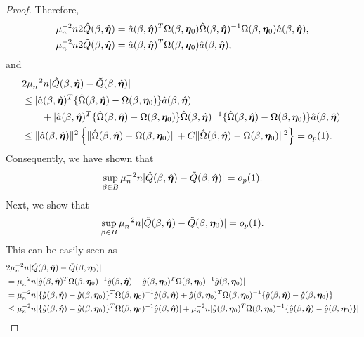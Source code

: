 \documentclass[12pt]{article}
\begin{document}
{\begin{proof}
Therefore, 
\begin{align*}
  &\mu_n^{-2} n 2 \hat Q(\beta, \hat{\bm \eta})= \hat a(\beta, \hat{\bm \eta})^T \Omega(\beta, \bm \eta_0) \hat\Omega(\beta, \hat{\bm \eta})^{-1}\Omega(\beta, \bm \eta_0) \hat a(\beta, \hat{\bm \eta}),\\
  &\mu_n^{-2} n 2 \tilde Q(\beta, \hat{\bm \eta})= \hat a(\beta, \hat{\bm \eta})^T \Omega(\beta, \bm \eta_0) \hat a(\beta, \hat{\bm \eta}),
\end{align*}
and 
\begin{align*}
    &2\mu_n^{-2} n |\hat Q (\beta, \hat{\bm \eta})- \tilde{Q} (\beta, \hat{\bm \eta}) | \\
    &\leq |\hat a(\beta, \hat{\bm \eta})^T \{ \hat\Omega(\beta, \hat{\bm \eta}) - \Omega(\beta, \bm \eta_0)\}\hat a(\beta, \hat{\bm \eta})| \\
    &\qquad + |\hat a(\beta, \hat{\bm \eta})^T \{ \hat\Omega(\beta, \hat{\bm \eta}) - \Omega(\beta, \bm \eta_0)\} \hat\Omega(\beta, \hat{\bm \eta})^{-1} \{ \hat\Omega(\beta, \hat{\bm \eta}) - \Omega(\beta, \bm \eta_0)\} \hat a(\beta, \hat{\bm \eta})  | \\
    &\leq \|\hat a(\beta, \hat{\bm \eta})\|^2 \left\{\| \hat\Omega(\beta, \hat{\bm \eta}) - \Omega(\beta, \bm \eta_0)\| + C\| \hat\Omega(\beta, \hat{\bm \eta}) - \Omega(\beta, \bm \eta_0)\|^2 \right\} = o_p(1).
\end{align*}
Consequently, we have shown that 
\begin{align}
    \sup_{\beta\in B} \mu_n^{-2} n |\hat Q (\beta, \hat{\bm \eta})- \tilde{Q} (\beta, \hat{\bm \eta}) | =o_p(1).
\end{align}
Next, we show that 
\[
\sup_{\beta\in B} \mu_n^{-2} n |\tilde Q (\beta, \hat{\bm \eta})- \tilde{Q} (\beta, \bm \eta_0) | =o_p(1).
\]
This can be easily seen as  
\begin{align*}
  & 2 \mu_n^{-2} n |\tilde Q (\beta, \hat\bfeta)- \tilde{Q} (\beta, \bfeta_0) | \\
  &= \mu_n^{-2}n|\hat g(\beta, \hat\bfeta)^T \Omega(\beta, \bfeta_0)^{-1} \hat g(\beta, \hat\bfeta) - \hat g(\beta, \bfeta_0)^T \Omega(\beta, \bfeta_0) ^{-1}\hat g(\beta, \bfeta_0)| \\
   &=   \mu_n^{-2}n|\{\hat g(\beta, \hat\bfeta)-\hat g(\beta, \bfeta_0) \}^T \Omega(\beta, \bfeta_0) ^{-1} \hat g(\beta, \hat\bfeta) +  \hat g(\beta, \bfeta_0)^T \Omega(\beta, \bfeta_0) ^{-1} \{\hat g(\beta, \hat\bfeta) - \hat g(\beta, \bfeta_0)\} | \\
   &\leq  \mu_n^{-2}n|\{\hat g(\beta, \hat\bfeta)-\hat g(\beta, \bfeta_0) \}^T \Omega(\beta, \bfeta_0)^{-1} \hat g(\beta, \hat\bfeta) |+\mu_n^{-2}n | \hat g(\beta, \bfeta_0)^T \Omega(\beta, \bfeta_0) ^{-1} \{\hat g(\beta, \hat\bfeta) - \hat g(\beta, \bfeta_0)\} | \\

\end{align*}
\end{proof}}
\end{document}
